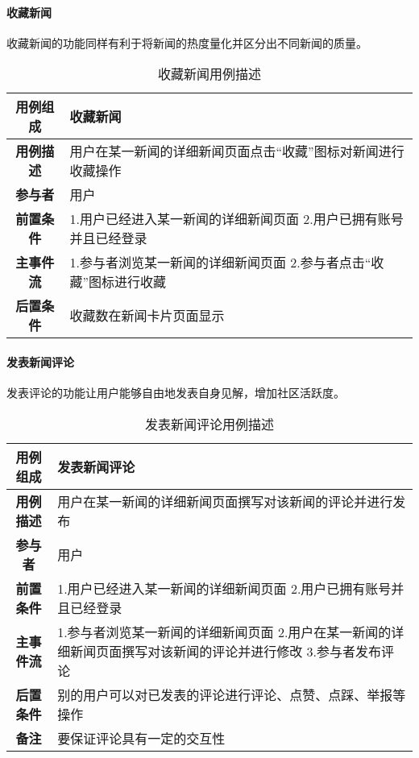 \paragraph{收藏新闻}

收藏新闻的功能同样有利于将新闻的热度量化并区分出不同新闻的质量。\\

\begin{table}[H]
	\centering
	\caption{收藏新闻用例描述}
	\renewcommand\arraystretch{1.5}
	\begin{tabular}{|c|>{\raggedright\arraybackslash}p{10cm}|}
		\hline
		\textbf{用例组成} & \textbf{收藏新闻}\\
		\hline
		\textbf{用例描述} & 用户在某一新闻的详细新闻页面点击“收藏”图标对新闻进行收藏操作\\ 
		\hline
		\textbf{参与者} & 用户\\
		\hline
		\textbf{前置条件} & 
		1.用户已经进入某一新闻的详细新闻页面\newline
		2.用户已拥有账号并且已经登录\\
		\hline
		\textbf{主事件流} & 
		1.参与者浏览某一新闻的详细新闻页面\newline
		2.参与者点击“收藏”图标进行收藏\\
		\hline
		\textbf{后置条件} & 收藏数在新闻卡片页面显示\\
		\hline
	\end{tabular}
\end{table}

\paragraph{发表新闻评论}

发表评论的功能让用户能够自由地发表自身见解，增加社区活跃度。\\

\begin{table}[H]
	\centering
	\caption{发表新闻评论用例描述}
	\renewcommand\arraystretch{1.5}
	\begin{tabular}{|c|>{\raggedright\arraybackslash}p{10cm}|}
		\hline
		\textbf{用例组成} & \textbf{发表新闻评论}\\
		\hline
		\textbf{用例描述} & 用户在某一新闻的详细新闻页面撰写对该新闻的评论并进行发布\\ 
		\hline
		\textbf{参与者} & 用户\\
		\hline
		\textbf{前置条件} & 
		1.用户已经进入某一新闻的详细新闻页面\newline
		2.用户已拥有账号并且已经登录\\
		\hline
		\textbf{主事件流} & 
		1.参与者浏览某一新闻的详细新闻页面\newline
		2.用户在某一新闻的详细新闻页面撰写对该新闻的评论并进行修改\newline
		3.参与者发布评论\\
		\hline
		\textbf{后置条件} & 别的用户可以对已发表的评论进行评论、点赞、点踩、举报等操作\\
		\hline
		\textbf{备注} & 要保证评论具有一定的交互性\\
		\hline
	\end{tabular}
\end{table}


